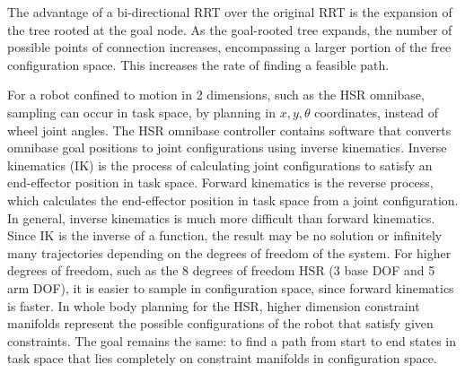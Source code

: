 \documentclass[12pt]{article}
\begin{document}
            \par The advantage of a bi-directional RRT over the original RRT is the expansion of the tree rooted at the goal node. As the goal-rooted tree expands, the number of possible points of connection increases, encompassing a larger portion of the free configuration space. This increases the rate of finding a feasible path.

            For a robot confined to motion in 2 dimensions, such as the HSR omnibase, sampling can occur in task space, by planning in $x,y, \theta$ coordinates, instead of wheel joint angles. The HSR omnibase controller contains software that converts omnibase goal positions to joint configurations using inverse kinematics. Inverse kinematics (IK) is the process of calculating joint configurations to satisfy an end-effector position in task space. Forward kinematics is the reverse process, which calculates the end-effector position in task space from a joint configuration. In general, inverse kinematics is much more difficult than forward kinematics. Since IK is the inverse of a function, the result may be no solution or infinitely many trajectories depending on the degrees of freedom of the system. 
            For higher degrees of freedom, such as the 8 degrees of freedom HSR (3 base DOF and 5 arm DOF), it is easier to sample in configuration space, since forward kinematics is faster. In whole body planning for the HSR, higher dimension constraint manifolds represent the possible configurations of the robot that satisfy given constraints. The goal remains the same: to find a path from start to end states in task space that lies completely on constraint manifolds in configuration space.
\end{document}
